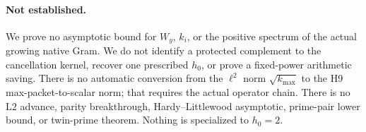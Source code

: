 \documentclass[11pt]{article}
\theoremstyle{definition}
\theoremstyle{remark}
\newcommand{\Ltwo}{\mathrm{L2}}
\begin{document}
\paragraph{Not established.}
We prove no asymptotic bound for \(W_y\), \(k_i\), or the positive
spectrum of the actual growing native Gram.  We do not identify a
protected complement to the cancellation kernel, recover one
prescribed \(h_0\), or prove a fixed-power arithmetic saving.  There
is no automatic conversion from the \(\ell^2\) norm
\(\sqrt{k_{\max}}\) to the H9 max-packet-to-scalar norm; that requires
the actual operator chain.  There
is no \(\Ltwo\) advance, parity breakthrough, Hardy--Littlewood
asymptotic, prime-pair lower bound, or twin-prime theorem.  Nothing is
specialized to \(h_0=2\).

\begingroup
\small
\setlength{\bibsep}{2pt plus 0.3ex}
\sloppy


\endgroup
\end{document}

